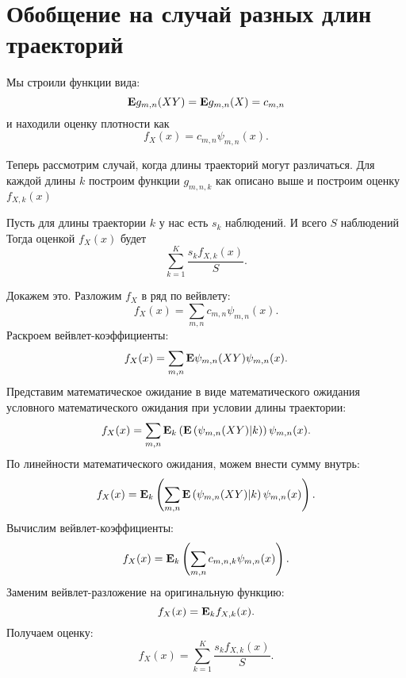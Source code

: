 \documentclass[../paper.tex]{subfiles}
\begin{document}
\chapter{Обобщение на случай разных длин траекторий}
Мы строили функции вида:
\[
  \mathbf{E} g_{m,n}(XY) = \mathbf{E} g_{m,n}(X) = c_{m,n}
\] и находили оценку плотности как
\[
  f_X(x) = c_{m,n} \psi_{m,n}(x)
.\]

Теперь рассмотрим случай, когда длины траекторий могут различаться.
Для каждой длины $k$ построим функции $g_{m,n,k}$ как описано выше
и построим оценку $f_{X,k}(x)$

Пусть для длины траектории $k$ у нас есть $s_k$ наблюдений. И всего $S$ наблюдений
Тогда оценкой $f_X(x)$ будет
\[
  \sum_{k=1}^K \frac{s_k f_{X,k}(x)}{S}
.\]

Докажем это. Разложим $f_X$ в ряд по вейвлету:
\[
  f_X(x) = \sum_{m,n} c_{m,n} \psi_{m,n}(x).
\]
Раскроем вейвлет-коэффициенты:
\[
  f_X(x) = \sum_{m,n} \mathbf{E} \psi_{m,n}(XY) \psi_{m,n}(x).
\]
Представим математическое ожидание в виде математического ожидания условного математического ожидания при условии длины траектории:
\[
  f_X(x) = \sum_{m,n} \mathbf{E}_k \left(\mathbf{E} \left(\psi_{m,n}(XY) | k \right) \right ) \psi_{m,n}(x).
\]
По линейности математического ожидания, можем внести сумму внутрь:
\[
  f_X(x) = \mathbf{E}_k \left( \sum_{m,n} \mathbf{E} \left(\psi_{m,n}(XY) | k \right) \psi_{m,n}(x) \right).
\]
Вычислим вейвлет-коэффициенты:
\[
  f_X(x) = \mathbf{E}_k \left(\sum_{m,n} c_{m,n,k} \psi_{m,n}(x) \right).
\]
Заменим вейвлет-разложение на оригинальную функцию:
\[
  f_X(x) = \mathbf{E}_k f_{X,k}(x).
\]
Получаем оценку:
\[
  f_X(x) = \sum_{k=1}^K \frac{s_k f_{X,k}(x)}{S}.
\]
\end{document}
